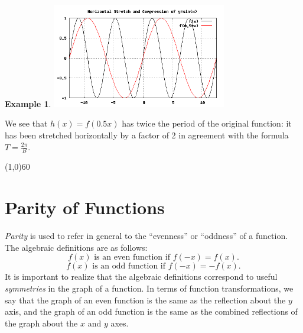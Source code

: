 \documentclass[10.5pt,twoside]{report}
\theoremstyle{definition}
\newtheorem{exmp}{Example}[section]
\begin{document}
\begin{exmp}
\includegraphics[width=3in]{example_1_4_2_2}

We see that $h(x)=f(0.5x)$ has twice the period of the original function:  it has been stretched horizontally by a factor of 2 in agreement with the formula $T=\frac{2\pi}{B}$.

\end{exmp}

\line(1,0){60}
\linethickness{0.5mm}


\pagebreak

\section{Parity of Functions}\label{Parity of Functions}

\textit{Parity} is used to refer in general to the ``evenness'' or ``oddness'' of a function.  The algebraic definitions are as follows:
$$f(x) \text{ is an even function if } f(-x)=f(x).$$
$$f(x) \text{ is an odd function if } f(-x)=-f(x).$$
It is important to realize that the algebraic definitions correspond to useful \textit{symmetries} in the graph of a function.  In terms of function transformations, we say that the graph of an even function is the same as the reflection about the $y$ axis, and the graph of an odd function is the same as the combined reflections of the graph about the $x$ and $y$ axes.   \\
${}$\\
\end{document}
